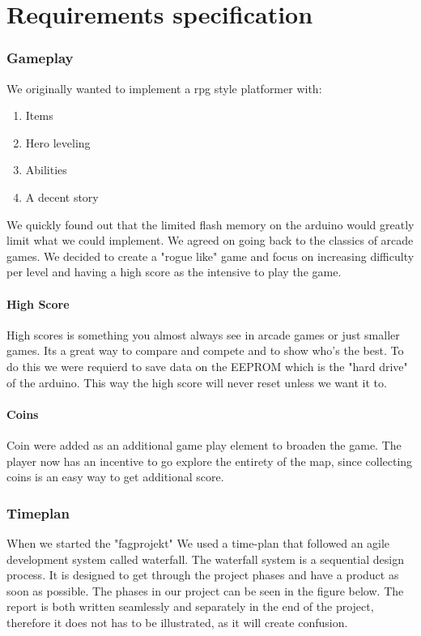 \chapter{Requirements specification}

\subsection{Gameplay}%
We originally wanted to implement a rpg style platformer with:
\begin{enumerate}
\item Items
\item Hero leveling
\item Abilities
\item A decent story
\end{enumerate}
We quickly found out that the limited flash memory on the arduino would greatly limit what we could implement. We agreed on going back to the classics of arcade games. We decided to create a "rogue like" game and focus on increasing difficulty per level and having a high score as the intensive to play the game.

\subsubsection{High Score}
High scores is something you almost always see in arcade games or just smaller games. Its a great way to compare and compete and to show who's the best. 
To do this we were requierd to save data on the EEPROM which is the "hard drive" of the arduino. This way the high score will never reset unless we want it to.

\subsubsection{Coins}
Coin were added as an additional game play element to broaden the game. The player now has an incentive to go explore the entirety of the map, since collecting coins is an easy way to get additional score.


\subsection{Timeplan} %
When we started the "fagprojekt" We used a time-plan that followed an agile development system called waterfall.
The waterfall system is a sequential design process.
It is designed to get through the project phases and have a product as soon as
possible. The phases in our project can be seen in the figure below.
The report is both written seamlessly and separately in the end of the project,
therefore it does not has to be illustrated, as it will create confusion.

